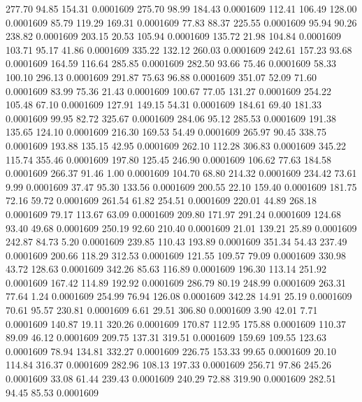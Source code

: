  277.70   94.85  154.31   0.0001609
 275.70   98.99  184.43   0.0001609
 112.41  106.49  128.00   0.0001609
  85.79  119.29  169.31   0.0001609
  77.83   88.37  225.55   0.0001609
  95.94   90.26  238.82   0.0001609
 203.15   20.53  105.94   0.0001609
 135.72   21.98  104.84   0.0001609
 103.71   95.17   41.86   0.0001609
 335.22  132.12  260.03   0.0001609
 242.61  157.23   93.68   0.0001609
 164.59  116.64  285.85   0.0001609
 282.50   93.66   75.46   0.0001609
  58.33  100.10  296.13   0.0001609
 291.87   75.63   96.88   0.0001609
 351.07   52.09   71.60   0.0001609
  83.99   75.36   21.43   0.0001609
 100.67   77.05  131.27   0.0001609
 254.22  105.48   67.10   0.0001609
 127.91  149.15   54.31   0.0001609
 184.61   69.40  181.33   0.0001609
  99.95   82.72  325.67   0.0001609
 284.06   95.12  285.53   0.0001609
 191.38  135.65  124.10   0.0001609
 216.30  169.53   54.49   0.0001609
 265.97   90.45  338.75   0.0001609
 193.88  135.15   42.95   0.0001609
 262.10  112.28  306.83   0.0001609
 345.22  115.74  355.46   0.0001609
 197.80  125.45  246.90   0.0001609
 106.62   77.63  184.58   0.0001609
 266.37   91.46    1.00   0.0001609
 104.70   68.80  214.32   0.0001609
 234.42   73.61    9.99   0.0001609
  37.47   95.30  133.56   0.0001609
 200.55   22.10  159.40   0.0001609
 181.75   72.16   59.72   0.0001609
 261.54   61.82  254.51   0.0001609
 220.01   44.89  268.18   0.0001609
  79.17  113.67   63.09   0.0001609
 209.80  171.97  291.24   0.0001609
 124.68   93.40   49.68   0.0001609
 250.19   92.60  210.40   0.0001609
  21.01  139.21   25.89   0.0001609
 242.87   84.73    5.20   0.0001609
 239.85  110.43  193.89   0.0001609
 351.34   54.43  237.49   0.0001609
 200.66  118.29  312.53   0.0001609
 121.55  109.57   79.09   0.0001609
 330.98   43.72  128.63   0.0001609
 342.26   85.63  116.89   0.0001609
 196.30  113.14  251.92   0.0001609
 167.42  114.89  192.92   0.0001609
 286.79   80.19  248.99   0.0001609
 263.31   77.64    1.24   0.0001609
 254.99   76.94  126.08   0.0001609
 342.28   14.91   25.19   0.0001609
  70.61   95.57  230.81   0.0001609
   6.61   29.51  306.80   0.0001609
   3.90   42.01    7.71   0.0001609
 140.87   19.11  320.26   0.0001609
 170.87  112.95  175.88   0.0001609
 110.37   89.09   46.12   0.0001609
 209.75  137.31  319.51   0.0001609
 159.69  109.55  123.63   0.0001609
  78.94  134.81  332.27   0.0001609
 226.75  153.33   99.65   0.0001609
  20.10  114.84  316.37   0.0001609
 282.96  108.13  197.33   0.0001609
 256.71   97.86  245.26   0.0001609
  33.08   61.44  239.43   0.0001609
 240.29   72.88  319.90   0.0001609
 282.51   94.45   85.53   0.0001609
